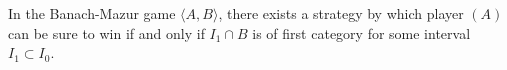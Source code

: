 In the Banach-Mazur game $\langle A, B \rangle$, there exists a strategy by which player $(A)$ can be sure to win if and only if $I_1 \cap B$ is of first category for some interval $I_1 \subset I_0$.
